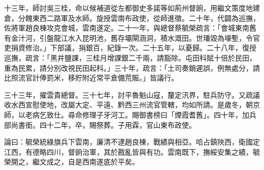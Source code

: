 \begin{pinyinscope}
十三年，師討吳三桂，命以候補道從左都御史多諾等如荊州督餉，用繼文策度地建倉，分餽東西二路軍及水師。旋授雲南布政使，從師進徵。二十年，代闢為巡撫，佐將軍趙良棟攻克會城，雲南遂定。二十一年，與總督蔡毓榮疏言：「會城東南舊有金汁河，引盤龍江水入昆明池，舊存壩閘涵洞，積水溉田。世璠毀為壕塹，令官吏捐資修治。」下部議，捐銀百，紀錄一次。二十五年，以憂歸。二十八年，復授巡撫，疏言：「黑井鹽課，三桂月增課銀二千兩，請豁除。屯田科賦十倍於民田，重為民累，請分別改視民田起科。」三十年，疏言：「土司奏銷遲誤，例無處分，請比照流官計俸罰米，移貯附近常平倉備荒賑。」皆議行。

三十三年，擢雲貴總督。三十七年，討平魯魁山寇，釐定汛界，駐兵防守。又疏議收水西宣慰使地，改屬大定、平遠、黔西三州流官管轄，均如所請。是歲冬，朝京師，以老病乞致仕。尋命修理子牙河工。賜御書榜曰「煙霞耆舊」。四十年，加兵部尚書銜。四十二年，卒，賜祭葬。子用霖，官山東布政使。

論曰：毓榮統綠旗兵下雲南，廉清不逮趙良棟，戰績與相亞。哈占鎮陜西，衛國定江西，有德略四川，督餉治軍，其於戡亂皆與有功。雲南既下，撫綏安集之績，毓榮開之，繼文成之，自是西南遂底於平矣。


\end{pinyinscope}